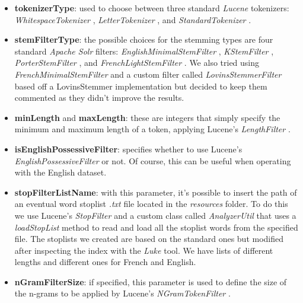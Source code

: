 \begin{itemize}
  \item \textbf{tokenizerType}: used to choose between three standard \textit{Lucene} tokenizers: \textit{WhitespaceTokenizer} \cite{lucenetokenizer}, \textit{LetterTokenizer} \cite{lucenelettertokenizer}, and \textit{StandardTokenizer} \cite{lucenestandardtokenizer}.
  
  \item \textbf{stemFilterType}: the possible choices for the stemming types are four standard \textit{Apache Solr} \cite{solr} filters: \textit{EnglishMinimalStemFilter} \cite{solrminimalstemfilter}, \textit{KStemFilter} \cite{solrkstemfilter}, \textit{PorterStemFilter} \cite{solrporterstemfilter}, and \textit{FrenchLightStemFilter} \cite{solrfrenchlightstemfilter}. 
  We also tried using \textit{FrenchMinimalStemFilter} \cite{solrfrenchminimalstemfilter} and a custom filter called \textit{LovinsStemmerFilter} based off a LovinsStemmer \cite{lucenelovinsstemmer} implementation but decided to keep them commented as they didn't improve the results.
  
  \item \textbf{minLength} and \textbf{maxLength}: these are integers that simply specify the minimum and maximum length of a token, applying Lucene's \textit{LengthFilter} \cite{lucenelengthfilter}.
  
  \item \textbf{isEnglishPossessiveFilter}: specifies whether to use Lucene's \textit{EnglishPossessiveFilter} \cite{luceneenglishpossessivefilter} or not. 
  Of course, this can be useful when operating with the English dataset.
  
  \item \textbf{stopFilterListName}: with this parameter, it's possible to insert the path of an eventual word stoplist \textit{.txt} file located in the \textit{resources} folder. 
  To do this we use Lucene's \textit{StopFilter} \cite{lucenestopfilter} and a custom class called \textit{AnalyzerUtil} that uses a \textit{loadStopList} method to read and load all the stoplist words from the specified file. 
  The stoplists we created are based on the standard ones but modified after inspecting the index with the \textit{Luke} \cite{luke} tool. 
  We have lists of different lengths and different ones for French and English.
  
  \item \textbf{nGramFilterSize}: if specified, this parameter is used to define the size of the n-grams to be applied by Lucene's \textit{NGramTokenFilter} \cite{lucenengramtokenfilter}.
  

\end{itemize}
